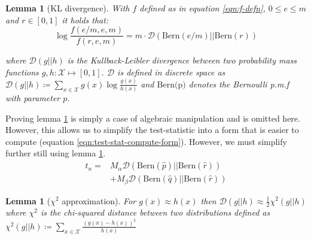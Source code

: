 \documentclass[11pt]{article}
\newcommand{\Xcal}{\mathcal{X}}
\newcommand{\kl}{\mathcal{D}}
\newtheorem{lemma}[theorem]{Lemma}
\begin{document}
\begin{multicols*}{2}
\begin{lemma}[KL divergence]
	With $f$ defined as in equation \ref{eqn:f-defn}, $0 \leq e \leq m$ and $r \in [0, 1]$ it holds that:
	\begin{equation*}
		\log \frac{f(e/m, e, m)}{f(r, e, m)} = m \cdot \kl \left( \textrm{Bern}(e/m) || \textrm{Bern}(r) \right)
	\end{equation*}

	where $\kl(g || h)$ is the Kullback-Leibler divergence between two probability mass functions $g, h: \Xcal \mapsto [0, 1]$. $\kl$ is defined in discrete space as $\kl(g || h) \coloneqq \sum_{x \in \Xcal} g(x) \log \frac{g(x)}{h(x)}$ and $\textrm{Bern(p)}$ denotes the Bernoulli p.m.f with parameter $p$.
	\label{lem:kl-div}
\end{lemma}

Proving lemma \ref{lem:kl-div} is simply a case of algebraic manipulation and is omitted here. However, this allows us to simplify the test-statistic into a form that is easier to compute (equation \ref{eqn:test-stat-compute-form}). However, we must simplify further still using lemma \ref{lem:kl-approx-chi}.
%
\begin{equation}
	\begin{aligned}
	t_n = &M_\alpha \kl\left( \textrm{Bern}(\hat{p}) || \textrm{Bern}(\hat{r})\right) \\
	&+ M_\beta \kl\left( \textrm{Bern}(\hat{q}) || \textrm{Bern}(\hat{r})\right)
	\end{aligned}
	\label{eqn:test-stat-compute-form}
\end{equation}
%
\begin{lemma}[$\chi^2$ approximation]
	\label{lem:kl-approx-chi}
	For $g(x) \approx h(x)$ then $\kl(g || h) \approx \frac{1}{2} \chi^2(g || h)$ where $\chi^2$ is the chi-squared distance between two distributions defined as $\chi^2(g || h) \coloneqq \sum_{x \in \Xcal} \frac{(g(x)-h(x))^2}{h(x)}$ 
\end{lemma}


\end{multicols*}
\end{document}
